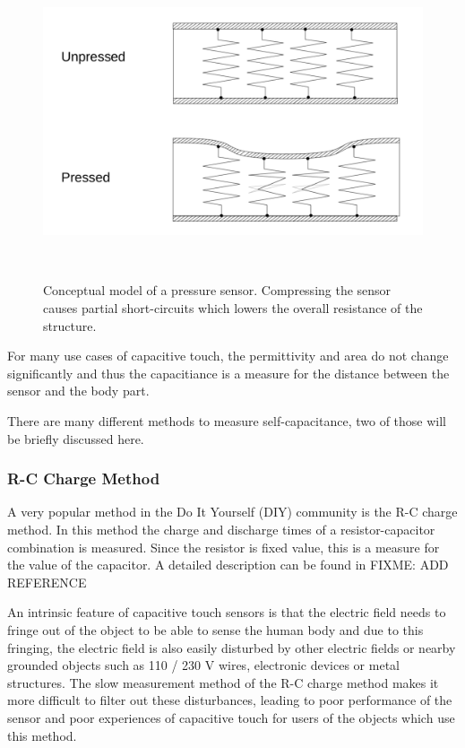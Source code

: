 \documentclass{sigchi-ext}
\begin{document}
\begin{figure}
\centering
\includegraphics[width=0.9\columnwidth]{figures/resistive_sensor}
 \caption{Conceptual model of a pressure sensor. Compressing the sensor causes
  partial short-circuits which lowers the overall resistance of the
  structure.}~\label{fig:pressure_sensor}
\end{figure}


For many use cases of capacitive touch, the permittivity and area do not change
significantly and thus the capacitiance is a measure for the distance between
the sensor and the body part.

There are many different methods to measure
self-capacitance, two of those will be briefly discussed here.

\subsubsection{R-C Charge Method}
A very popular method in the Do It Yourself (DIY) community is the R-C charge
method. In this method the charge and discharge times of a resistor-capacitor
combination is measured. Since the resistor is fixed value, this is a measure
for the value of the capacitor. A detailed description can be found in FIXME:
ADD REFERENCE 

An intrinsic feature of capacitive touch sensors is that the
electric field needs to fringe out of the object to be able to sense the human
body and due to this fringing, the electric field is also easily disturbed by
other electric fields or nearby grounded objects such as 110 / 230 V wires,
electronic devices or metal structures. The slow measurement method of the R-C charge
method makes it more difficult to filter out these disturbances, leading to poor
performance of the sensor and poor experiences of capacitive touch for users of
the objects which use this method.
\end{document}
